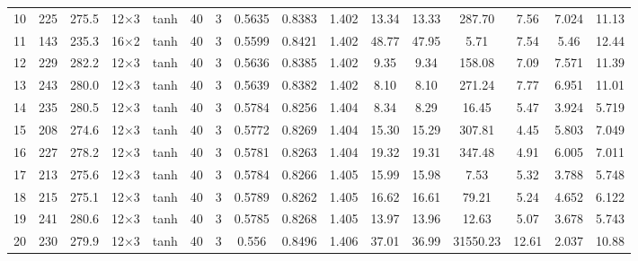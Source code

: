 \begin{tabular}{lcc cccc ccccccc cc}
  10 & 225 & 275.5 & 12$\times$3 & tanh & 40 & 3 & \num{0.5635} & \num{0.8383} & \num{1.402} & 13.34 & 13.33 & 287.70 & 7.56 & \num{7.024} & \num{11.13} \\
  11 & 143 & 235.3 & 16$\times$2 & tanh & 40 & 3 & \num{0.5599} & \num{0.8421} & \num{1.402} & 48.77 & 47.95 & 5.71 & 7.54 & \num{5.46} & \num{12.44} \\
  12 & 229 & 282.2 & 12$\times$3 & tanh & 40 & 3 & \num{0.5636} & \num{0.8385} & \num{1.402} & 9.35 & 9.34 & 158.08 & 7.09 & \num{7.571} & \num{11.39} \\
  13 & 243 & 280.0 & 12$\times$3 & tanh & 40 & 3 & \num{0.5639} & \num{0.8382} & \num{1.402} & 8.10 & 8.10 & 271.24 & 7.77 & \num{6.951} & \num{11.01} \\
  14 & 235 & 280.5 & 12$\times$3 & tanh & 40 & 3 & \num{0.5784} & \num{0.8256} & \num{1.404} & 8.34 & 8.29 & 16.45 & 5.47 & \num{3.924} & \num{5.719} \\
  15 & 208 & 274.6 & 12$\times$3 & tanh & 40 & 3 & \num{0.5772} & \num{0.8269} & \num{1.404} & 15.30 & 15.29 & 307.81 & 4.45 & \num{5.803} & \num{7.049} \\
  16 & 227 & 278.2 & 12$\times$3 & tanh & 40 & 3 & \num{0.5781} & \num{0.8263} & \num{1.404} & 19.32 & 19.31 & 347.48 & 4.91 & \num{6.005} & \num{7.011} \\
  17 & 213 & 275.6 & 12$\times$3 & tanh & 40 & 3 & \num{0.5784} & \num{0.8266} & \num{1.405} & 15.99 & 15.98 & 7.53 & 5.32 & \num{3.788} & \num{5.748} \\
  18 & 215 & 275.1 & 12$\times$3 & tanh & 40 & 3 & \num{0.5789} & \num{0.8262} & \num{1.405} & 16.62 & 16.61 & 79.21 & 5.24 & \num{4.652} & \num{6.122} \\
  19 & 241 & 280.6 & 12$\times$3 & tanh & 40 & 3 & \num{0.5785} & \num{0.8268} & \num{1.405} & 13.97 & 13.96 & 12.63 & 5.07 & \num{3.678} & \num{5.743} \\
  20 & 230 & 279.9 & 12$\times$3 & tanh & 40 & 3 & \num{0.556} & \num{0.8496} & \num{1.406} & 37.01 & 36.99 & 31550.23 & 12.61 & \num{2.037} & \num{10.88} \\
\bottomrule
\end{tabular}
